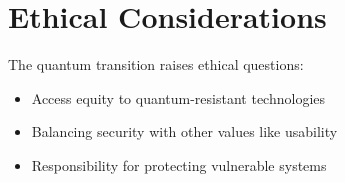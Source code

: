 \section{Ethical Considerations}
The quantum transition raises ethical questions:
\begin{itemize}
    \item Access equity to quantum-resistant technologies
    \item Balancing security with other values like usability
    \item Responsibility for protecting vulnerable systems
\end{itemize}